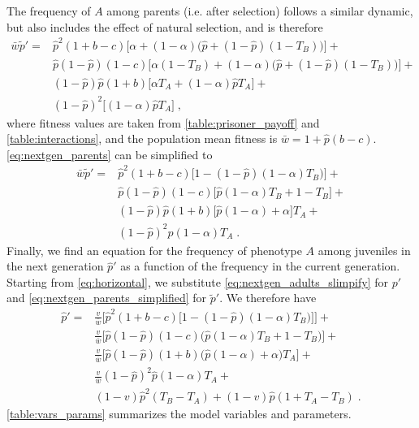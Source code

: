 \documentclass[12pt]{extarticle}
\begin{document}
The frequency of $A$ among parents (i.e. after selection) follows a similar dynamic, but also includes the effect of natural selection, and is therefore
\begin{equation}\label{eq:nextgen_parents}
\begin{aligned}
\bar{w} \tilde{p}' =
& \hat{p}^2 (1+b-c) \big[\alpha + (1-\alpha)\big(\hat{p} + (1-\hat{p})(1-T_B)\big)\big] + \\
& \hat{p}(1-\hat{p}) (1-c) \big[\alpha(1-T_B) + (1-\alpha)\big(\hat{p} + (1-\hat{p})(1-T_B)\big)\big] + \\
& (1-\hat{p})\hat{p} (1+b) \big[\alpha T_A + (1-\alpha) \hat{p} T_A \big] + \\
& (1-\hat{p})^2 \big[(1-\alpha) \hat{p} T_A \big] \;,
\end{aligned}
\end{equation}
where fitness values are taken from \autoref{table:prisoner_payoff} and \autoref{table:interactions}, and the population mean fitness is
$\bar{w} =  1 + \hat{p}(b-c)$.
\autoref{eq:nextgen_parents} can be simplified to
\begin{equation}\label{eq:nextgen_parents_simplified}
\begin{aligned}
\bar{w} \tilde{p}' =
& \hat{p}^2 (1+b-c) \big[1-(1-\hat{p})(1-\alpha)T_B)\big] + \\
& \hat{p}(1-\hat{p}) (1-c) \big[\hat{p}(1-\alpha)T_B+1-T_B \big] + \\
& (1-\hat{p})\hat{p} (1+b) \big[\hat{p}(1-\alpha) + \alpha \big] T_A + \\
& (1-\hat{p})^2 \hat{p} (1-\alpha) T_A \;.
\end{aligned}
\end{equation}
Finally, we find an equation for the frequency of phenotype $A$ among juveniles in the next generation $\hat{p}'$ as a function of the frequency in the current generation.
Starting from \autoref{eq:horizontal}, we substitute \autoref{eq:nextgen_adults_slimpify} for $p'$ and  \autoref{eq:nextgen_parents_simplified} for $\tilde{p}'$.
We therefore have
\begin{equation} \label{eq:nextgen_juveniles}
\begin{aligned}
\hat{p}' =
& \frac{v}{\bar{w}}\Big[\hat{p}^2(1+b-c)\Big[1-(1-\hat{p})(1-\alpha)T_B)\Big]\Big] + \\
& \frac{v}{\bar{w}}\Big[ \hat{p}(1-\hat{p})(1-c)\big( \hat{p}(1-\alpha)T_B + 1 - T_B \big) \Big] + \\
& \frac{v}{\bar{w}}\Big[ \hat{p}(1-\hat{p})(1+b)\big(\hat{p}(1-\alpha) + \alpha \big) T_A \Big] + \\
& \frac{v}{\bar{w}}(1-\hat{p})^2\hat{p}(1-\alpha)T_A + \\
& (1-v)\hat{p}^2(T_B-T_A) + (1-v)\hat{p}(1+T_A-T_B) \;.
\end{aligned}
\end{equation}
\autoref{table:vars_params} summarizes the model variables and parameters.
\end{document}
